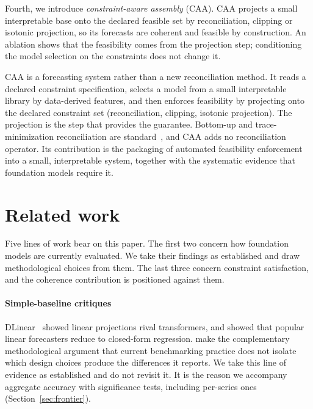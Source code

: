 \documentclass[review,number]{elsarticle}
\begin{document}
Fourth, we introduce \emph{constraint-aware assembly} (CAA). CAA projects a small
interpretable base onto the declared feasible set by reconciliation, clipping or isotonic
projection, so its forecasts are coherent and feasible by construction. An ablation shows
that the feasibility comes from the projection step; conditioning the model selection
on the constraints does not change it.

CAA is a forecasting system rather than a new reconciliation method. It reads a
declared constraint specification, selects a model from a small interpretable library
by data-derived features, and then enforces feasibility by projecting onto the declared
constraint set (reconciliation, clipping, isotonic projection). The projection is the
step that provides the guarantee. Bottom-up and trace-minimization reconciliation are
standard~\citep{mint2019,hfreview2024}, and CAA adds no reconciliation operator. Its
contribution is the packaging of automated feasibility enforcement into a small,
interpretable system, together with the systematic evidence that foundation models
require it.

\section{Related work}
\label{sec:related}
Five lines of work bear on this paper. The first two concern how foundation models are
currently evaluated. We take their findings as established and draw methodological
choices from them. The last three concern constraint satisfaction,
and the coherence contribution is positioned against them.

\paragraph{Simple-baseline critiques} DLinear~\citep{dlinear2023} showed linear
projections rival transformers, and \citet{toner2024linear} showed that popular linear
forecasters reduce to closed-form regression. \citet{benchmarking2026} make the
complementary methodological argument that current benchmarking practice does not
isolate which design choices produce the differences it reports. We take this line of
evidence as established and do not revisit it. It is the reason we accompany
aggregate accuracy with significance tests, including per-series ones
(Section~\ref{sec:frontier}).
\end{document}
